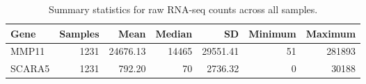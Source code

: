 \begin{table}

\caption{\label{tab:gene-summary}Summary statistics for raw RNA-seq counts across all samples.}
\centering
\begin{tabular}[t]{lrrrrrr}
\toprule
Gene & Samples & Mean & Median & SD & Minimum & Maximum\\
\midrule
MMP11 & 1231 & 24676.13 & 14465 & 29551.41 & 51 & 281893\\
SCARA5 & 1231 & 792.20 & 70 & 2736.32 & 0 & 30188\\
\bottomrule
\end{tabular}
\end{table}

